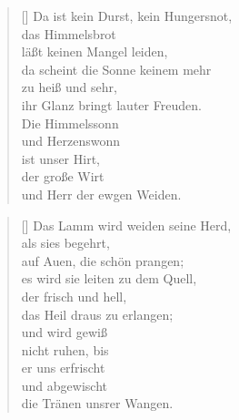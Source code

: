 \begin{multicols}{2}
\begin{verse}[\versewidth]
 Da ist kein Durst, kein Hungersnot,\\
das Himmelsbrot\\
läßt keinen Mangel leiden,\\
da scheint die Sonne keinem mehr\\
zu heiß und sehr,\\
ihr Glanz bringt lauter Freuden.\\
Die Himmelssonn\\
und Herzenswonn\\
ist unser Hirt,\\
der große Wirt\\
und Herr der ewgen Weiden.
\end{verse}
\end{multicols}

\begin{center}
\settowidth{\versewidth}{Das Lamm wird weiden seine Herd,}
\begin{verse}[\versewidth]
 Das Lamm wird weiden seine Herd,\\
als sies begehrt,\\
auf Auen, die schön prangen;\\
es wird sie leiten zu dem Quell,\\
der frisch und hell,\\
das Heil draus zu erlangen;\\
und wird gewiß\\
nicht ruhen, bis\\
er uns erfrischt\\
und abgewischt\\
die Tränen unsrer Wangen.
 
\end{verse}
\end{center}




